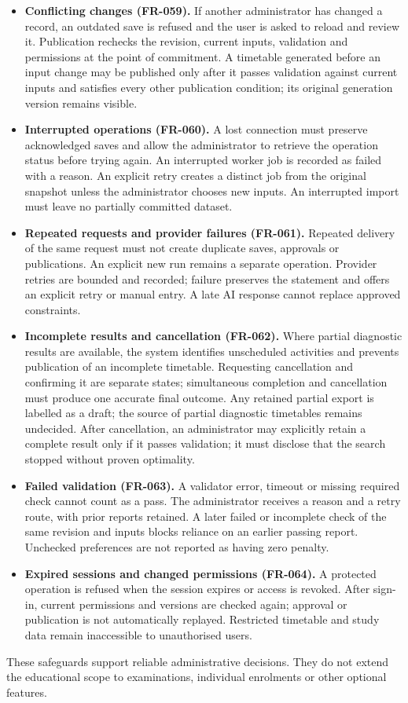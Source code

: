 \documentclass[
  11pt,a4paper,oneside]{report}
\begin{document}
\begin{itemize}
\item \textbf{Conflicting changes (FR-059).} If another administrator has changed a record, an outdated save is refused and the user is asked to reload and review it. Publication rechecks the revision, current inputs, validation and permissions at the point of commitment. A timetable generated before an input change may be published only after it passes validation against current inputs and satisfies every other publication condition; its original generation version remains visible.
\item \textbf{Interrupted operations (FR-060).} A lost connection must preserve acknowledged saves and allow the administrator to retrieve the operation status before trying again. An interrupted worker job is recorded as failed with a reason. An explicit retry creates a distinct job from the original snapshot unless the administrator chooses new inputs. An interrupted import must leave no partially committed dataset.
\item \textbf{Repeated requests and provider failures (FR-061).} Repeated delivery of the same request must not create duplicate saves, approvals or publications. An explicit new run remains a separate operation. Provider retries are bounded and recorded; failure preserves the statement and offers an explicit retry or manual entry. A late AI response cannot replace approved constraints.
\item \textbf{Incomplete results and cancellation (FR-062).} Where partial diagnostic results are available, the system identifies unscheduled activities and prevents publication of an incomplete timetable. Requesting cancellation and confirming it are separate states; simultaneous completion and cancellation must produce one accurate final outcome. Any retained partial export is labelled as a draft; the source of partial diagnostic timetables remains undecided. After cancellation, an administrator may explicitly retain a complete result only if it passes validation; it must disclose that the search stopped without proven optimality.
\item \textbf{Failed validation (FR-063).} A validator error, timeout or missing required check cannot count as a pass. The administrator receives a reason and a retry route, with prior reports retained. A later failed or incomplete check of the same revision and inputs blocks reliance on an earlier passing report. Unchecked preferences are not reported as having zero penalty.
\item \textbf{Expired sessions and changed permissions (FR-064).} A protected operation is refused when the session expires or access is revoked. After sign-in, current permissions and versions are checked again; approval or publication is not automatically replayed. Restricted timetable and study data remain inaccessible to unauthorised users.
\end{itemize}
These safeguards support reliable administrative decisions. They do not extend the educational scope to examinations, individual enrolments or other optional features.
\end{document}
